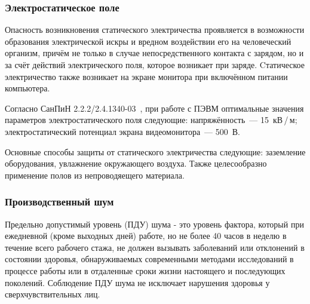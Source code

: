 \subsubsection{Электростатическое поле}

Опасность возникновения статического электричества проявляется в возможности образования электрической искры и вредном воздействии его на человеческий организм, причём не только в случае непосредственного контакта с зарядом, но и за счёт действий электрического поля, которое возникает при заряде. 
Cтатическое электричество также возникает на экране монитора при включённом питании компьютера. 

Согласно СанПиН 2.2.2/2.4.1340-03~\cite{SanPin2003}, при работе с ПЭВМ оптимальные значения параметров электростатического поля следующие: напряжённость~--- 15~кВ\,/\,м; электростатический потенциал экрана видеомонитора~--- 500~В.

Основные способы защиты от статического электричества следующие: заземление оборудования, увлажнение окружающего воздуха. Также целесообразно применение полов из непроводяещего материала.


\subsubsection{Производственный шум}

Предельно допустимый уровень (ПДУ) шума - это уровень фактора, который при ежедневной (кроме выходных дней) работе, но не более 40 часов в неделю в течение всего рабочего стажа, не должен вызывать заболеваний или отклонений в состоянии здоровья, обнаруживаемых современными методами исследований в процессе работы или в отдаленные сроки жизни настоящего и последующих поколений. 
Соблюдение ПДУ шума не исключает нарушения здоровья у сверхчувствительных лиц.


